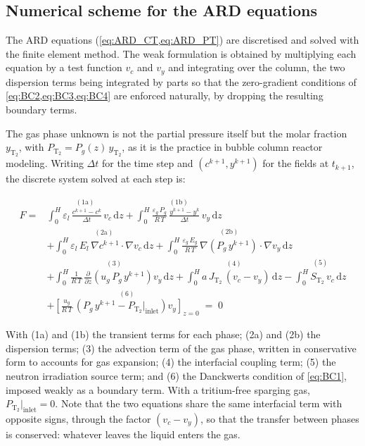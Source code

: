 \documentclass[a4paper,11pt,oneside]{report}
\newcommand{\PT}{\ensuremath{P_\mathrm{T_2}}}
\newcommand{\JT}{\ensuremath{J_\mathrm{T_2}}}
\begin{document}
\subsection{Numerical scheme for the ARD equations}
\label{sec:numerical_scheme}

The ARD equations (\cref{eq:ARD_CT,eq:ARD_PT}) are discretised and solved with the finite element method. The weak formulation is obtained by multiplying each equation by a test function $v_c$ and $v_y$ and integrating over the column, the two dispersion terms being integrated by parts so that the zero-gradient conditions of \cref{eq:BC2,eq:BC3,eq:BC4} are enforced naturally, by dropping the resulting boundary terms.

The gas phase unknown is not the partial pressure itself but the  molar fraction $y_\mathrm{T_2}$, with $\PT=P_g(z)\,y_\mathrm{T_2}$, as it is the practice in bubble column reactor modeling\cite{malara_tritium_1995}. Writing $\Delta t$ for the time step and $(c^{k+1},y^{k+1})$ for the fields at $t_{k+1}$, the discrete system solved at each step is:

\begin{align}
\label{eq:weak_form}
    F = &\stackrel{\mathrm{(1a)}}{\int_0^H \varepsilon_l\,\frac{c^{k+1}-c^{k}}{\Delta t}\,v_c \,\mathrm{d}z} + \stackrel{\mathrm{(1b)}}{\int_0^H \frac{\varepsilon_g\,P_g}{R\,T}\,\frac{y^{k+1}-y^{k}}{\Delta t}\,v_y \,\mathrm{d}z} \nonumber\\
    &+ \stackrel{\mathrm{(2a)}}{\int_0^H \varepsilon_l\,E_l\,\nabla c^{k+1}\cdot\nabla v_c \,\mathrm{d}z} + \stackrel{\mathrm{(2b)}}{\int_0^H \frac{\varepsilon_g\,E_g}{R\,T}\,\nabla\!\left(P_g\,y^{k+1}\right)\cdot\nabla v_y \,\mathrm{d}z} \nonumber\\
    &+ \stackrel{\mathrm{(3)}}{\int_0^H \frac{1}{R\,T}\,\frac{\partial}{\partial z}\!\left(u_g\,P_g\,y^{k+1}\right) v_y \,\mathrm{d}z} + \stackrel{\mathrm{(4)}}{\int_0^H a\,\JT\,(v_c - v_y) \,\mathrm{d}z} - \stackrel{\mathrm{(5)}}{\int_0^H S_\mathrm{T_2}\,v_c \,\mathrm{d}z} \nonumber\\
    &+ \stackrel{\mathrm{(6)}}{\left[\frac{u_g}{R\,T}\,\left(P_g\,y^{k+1} - \PT\rvert_\mathrm{inlet}\right) v_y\right]_{z=0}} \;=\; 0
\end{align}

With (1a) and (1b) the transient terms for each phase; (2a) and (2b) the dispersion terms; (3) the advection term of the gas phase, written in conservative form to accounts for gas expansion; (4) the interfacial coupling term; (5) the neutron irradiation source term; and (6) the Danckwerts condition of \cref{eq:BC1}, imposed weakly as a boundary term. With a tritium-free sparging gas, $\PT\rvert_\mathrm{inlet}=0$. Note that the two equations share the same interfacial term with opposite signs, through the factor $(v_c-v_y)$, so that the transfer between phases is conserved: whatever leaves the liquid enters the gas.
\end{document}
